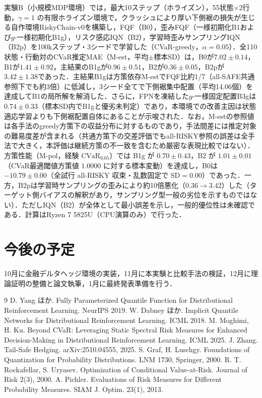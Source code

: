 \documentclass[a4paper,twocolumn,10pt]{jsarticle}
\begin{document}
実験B（小規模MDP環境）では，最大10ステップ（ホライズン），55状態$\times$2行動，$\gamma=1$ の有限ホライズン環境で，クラッシュにより厚い下側裾の損失が生じる自作環境RiskyChain-v0を構築し，FQF（B0），歪みFQF（一様初期化B1および$g$-一様初期化B1g），リスク感応IQN（B2），学習時歪みサンプリングIQN（B2p）を100kステップ・3シードで学習した（CVaR-greedy，$\alpha=0.05$）．全110状態・行動対のCVaR推定MAE（M-est，平均$\pm$標本SD）は，B0が$7.02\pm0.14$，B1が$1.41\pm0.92$，主結果のB1gが$0.96\pm0.51$，B2が$0.36\pm0.05$，B2pが$3.42\pm1.38$であった．主結果B1gは方策依存M-estでFQF比約1/7（all-SAFE共通参照下でも約3倍）に低減し，3シード全てで下側裾集中配置（平均14.06個）を達成してB1の局所解を解消した．さらに，FPNを凍結した$g$-一様固定配置B3gは$0.74\pm0.33$（標本SD内でB1gと優劣未判定）であり，本環境での改善主因は状態適応学習よりも下側裾配置自体にあることが示唆された．なお，M-estの参照値は各手法のgreedy方策下の収益分布に対するものであり，手法間差には推定対象の難易度差が含まれる（共通方策下の交差評価でもall-RISKY参照の誤差は全手法で大きく，本評価は継続方策の不一致を含むため厳密な表現比較ではない）．方策性能（M-pol，経験 $\mathrm{CVaR}_{0.05}$）では B1g が $0.70\pm0.43$，B2 が $1.01\pm0.01$（CVaR最適閾値方策値 $1.0000$ に対する標本変動）を達成し，B0は $-10.79\pm0.00$（全試行 all-RISKY 収束・乱数固定で SD$=0.00$）であった．一方，B2pは学習時サンプリングの歪みにより約10倍悪化（$0.36\to3.42$）した（ターゲット側バイアスの解釈があり，サンプリング型一般の劣位を示すものではない）．ただしIQN（B2）が全体として最小誤差を示し，一般的優位性は未確認である．計算はRyzen 7 5825U（CPU演算のみ）で行った．

\section{今後の予定}
10月に金融デルタヘッジ環境の実装，11月に本実験と比較手法の検証，12月に理論証明の整備と論文執筆，1月に最終発表準備を行う．

\begin{thebibliography}{9}
\scriptsize
\setlength{\itemsep}{0pt}
\setlength{\parskip}{0pt}
 D. Yang ほか. Fully Parameterized Quantile Function for Distributional Reinforcement Learning. NeurIPS 2019.
 W. Dabney ほか. Implicit Quantile Networks for Distributional Reinforcement Learning. ICML 2018.
 M. Moghimi, H. Ku. Beyond CVaR: Leveraging Static Spectral Risk Measures for Enhanced Decision-Making in Distributional Reinforcement Learning. ICML 2025.
 J. Zhang. Tail-Safe Hedging. arXiv:2510.04555, 2025.
 S. Graf, H. Luschgy. Foundations of Quantization for Probability Distributions. LNM 1730, Springer, 2000.
 R. T. Rockafellar, S. Uryasev. Optimization of Conditional Value-at-Risk. Journal of Risk 2(3), 2000.
 A. Pichler. Evaluations of Risk Measures for Different Probability Measures. SIAM J. Optim. 23(1), 2013.
\end{thebibliography}
\end{document}
